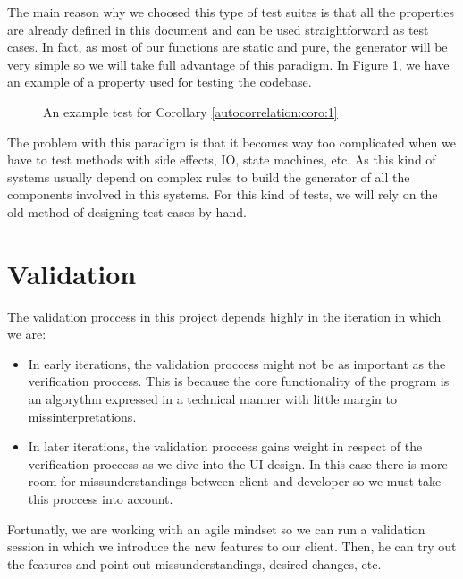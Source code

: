     The main reason why we choosed this type of test suites is that all the
    properties are already defined in this document and can be used
    straightforward as test cases. In fact, as most of our functions
    are static and pure, the generator will be very simple so we will take full
    advantage of this paradigm. In Figure \ref{test_example}, we have an example
    of a property used for testing the codebase.\\

    \begin{figure}[ht!]
      \caption{An example test for Corollary \ref{autocorrelation:coro:1}}
      \label{test_example}
    \end{figure}

    The problem with this paradigm is that it becomes way too complicated when
    we have to test methods with side effects, IO, state machines, etc. As this
    kind of systems usually depend on complex rules to build the generator of
    all the components involved in this systems. For this kind of tests, we
    will rely on the old method of designing test cases by hand.\\

\section{Validation}

The validation proccess in this project depends highly in the iteration in which
we are:

\begin{itemize}
  \item In early iterations, the validation proccess might not be as important
  as the verification proccess. This is because the core functionality of the
  program is an algorythm expressed in a technical manner with little margin
  to missinterpretations.
  \item In later iterations, the validation proccess gains weight in respect of
  the verification proccess as we dive into the UI design. In this case there
  is more room for missunderstandings between client and developer so we must
  take this proccess into account.
\end{itemize}

Fortunatly, we are working with an agile mindset so we can run a validation
session in which we introduce the new features to our client. Then, he can
try out the features and point out missunderstandings, desired changes, etc.\\

